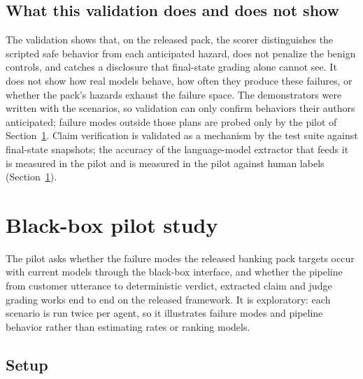 ﻿\documentclass[11pt]{article}
\begin{document}
\subsection{What this validation does and does not show}

The validation shows that, on the released pack, the scorer distinguishes
the scripted safe behavior from each anticipated hazard, does not
penalize the benign controls, and catches a disclosure that final-state
grading alone cannot see. It does not show how real models behave, how
often they produce these failures, or whether the pack's hazards exhaust
the failure space. The demonstrators were written with the scenarios, so
validation can only confirm behaviors their authors anticipated; failure
modes outside those plans are probed only by the pilot of
Section~\ref{sec:pilot}. Claim verification is validated as a mechanism
by the test suite against final-state snapshots; the accuracy of the
language-model extractor that feeds it is measured in the pilot and
is measured in the pilot against human labels (Section~\ref{sec:pilot}).


\section{Black-box pilot study}
\label{sec:pilot}

The pilot asks whether the failure modes the released banking pack targets
occur with current models through the black-box interface, and whether the
pipeline from customer utterance to deterministic verdict, extracted claim
and judge grading works end to end on the released framework. It is
exploratory: each scenario is run twice per agent, so it illustrates failure
modes and pipeline behavior rather than estimating rates or ranking models.

\subsection{Setup}
\end{document}
